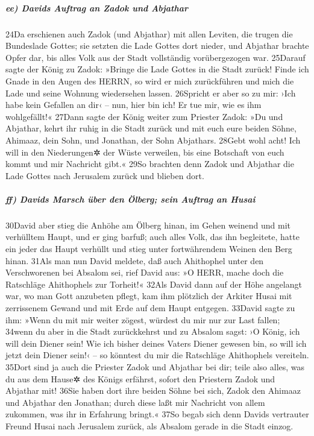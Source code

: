 \hypertarget{ee-davids-auftrag-an-zadok-und-abjathar}{%
\subparagraph{ee) Davids Auftrag an Zadok und
Abjathar}\label{ee-davids-auftrag-an-zadok-und-abjathar}}

24Da erschienen auch Zadok (und Abjathar) mit allen Leviten, die trugen
die Bundeslade Gottes; sie setzten die Lade Gottes dort nieder, und
Abjathar brachte Opfer dar, bis alles Volk aus der Stadt vollständig
vorübergezogen war. 25Darauf sagte der König zu Zadok: »Bringe die Lade
Gottes in die Stadt zurück! Finde ich Gnade in den Augen des HERRN, so
wird er mich zurückführen und mich die Lade und seine Wohnung
wiedersehen lassen. 26Spricht er aber so zu mir: ›Ich habe kein Gefallen
an dir‹ -- nun, hier bin ich! Er tue mir, wie es ihm wohlgefällt!«
27Dann sagte der König weiter zum Priester Zadok: »Du und Abjathar,
kehrt ihr ruhig in die Stadt zurück und mit euch eure beiden Söhne,
Ahimaaz, dein Sohn, und Jonathan, der Sohn Abjathars. 28Gebt wohl acht!
Ich will in den Niederungen✲ der Wüste verweilen, bis eine Botschaft von
euch kommt und mir Nachricht gibt.« 29So brachten denn Zadok und
Abjathar die Lade Gottes nach Jerusalem zurück und blieben dort.

\hypertarget{ff-davids-marsch-uxfcber-den-uxf6lberg-sein-auftrag-an-husai}{%
\subparagraph{ff) Davids Marsch über den Ölberg; sein Auftrag an
Husai}\label{ff-davids-marsch-uxfcber-den-uxf6lberg-sein-auftrag-an-husai}}

30David aber stieg die Anhöhe am Ölberg hinan, im Gehen weinend und mit
verhülltem Haupt, und er ging barfuß; auch alles Volk, das ihn
begleitete, hatte ein jeder das Haupt verhüllt und stieg unter
fortwährendem Weinen den Berg hinan. 31Als man nun David meldete, daß
auch Ahithophel unter den Verschworenen bei Absalom sei, rief David aus:
»O HERR, mache doch die Ratschläge Ahithophels zur Torheit!« 32Als David
dann auf der Höhe angelangt war, wo man Gott anzubeten pflegt, kam ihm
plötzlich der Arkiter Husai mit zerrissenem Gewand und mit Erde auf dem
Haupt entgegen. 33David sagte zu ihm: »Wenn du mit mir weiter zögest,
würdest du mir nur zur Last fallen; 34wenn du aber in die Stadt
zurückkehrst und zu Absalom sagst: ›O König, ich will dein Diener sein!
Wie ich bisher deines Vaters Diener gewesen bin, so will ich jetzt dein
Diener sein!‹ -- so könntest du mir die Ratschläge Ahithophels
vereiteln. 35Dort sind ja auch die Priester Zadok und Abjathar bei dir;
teile also alles, was du aus dem Hause✲ des Königs erfährst, sofort den
Priestern Zadok und Abjathar mit! 36Sie haben dort ihre beiden Söhne bei
sich, Zadok den Ahimaaz und Abjathar den Jonathan; durch diese laßt mir
Nachricht von allem zukommen, was ihr in Erfahrung bringt.« 37So begab
sich denn Davids vertrauter Freund Husai nach Jerusalem zurück, als
Absalom gerade in die Stadt einzog.

